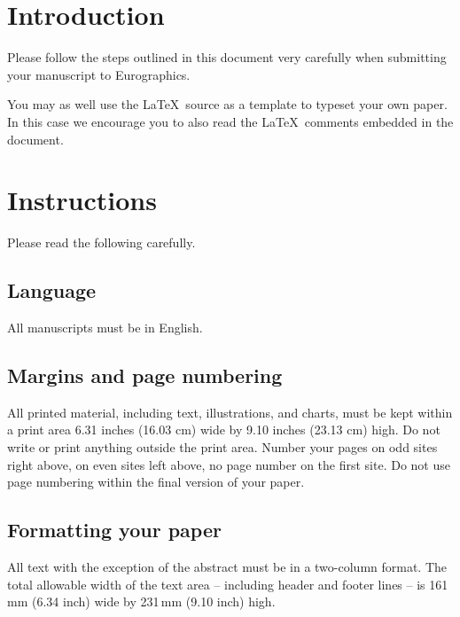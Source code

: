 \section{Introduction}

Please follow the steps outlined in this document very carefully when
submitting your manuscript to Eurographics.

You may as well use the \LaTeX\ source as a template to typeset your own
paper. In this case we encourage you to also read the \LaTeX\ comments
embedded in the document.

\section{Instructions}

Please read the following carefully.

\subsection{Language}

All manuscripts must be in English.

\subsection{Margins and page numbering}

All printed material, including text, illustrations, and charts,
must be kept within a print area 6.31 inches (16.03 cm) wide by
9.10 inches (23.13 cm) high. Do not write or print anything
outside the print area. Number your pages on odd sites right
above, on even sites left above, no page number on the first site.
Do not use page numbering within the final version of your paper.


\subsection{Formatting your paper}

All text with the exception of the abstract must be in a two-column format.
The total allowable width of the text area -- including header and footer
lines -- is 161\,mm (6.34 inch) wide by 231\,mm (9.10 inch) high.

